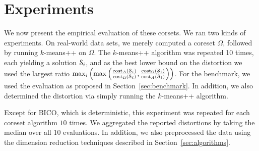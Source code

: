 \section{Experiments} \label{sec:experiments}

We now present the empirical evaluation of these corsets.
We ran two kinds of experiments. On real-world data sets, we merely computed a coreset $\Omega$, followed by running $k$-means++ on $\Omega$. 
The $k$-means++ algorithm was repeated 10 times, each yielding a solution $\mathcal{S}_i$, and as the best lower bound on the distortion we used the largest ratio $\max_i\left(\max\left(\frac{\text{cost}_A(\mathcal{S}_i)}{\text{cost}_{\Omega}(\mathcal{S}_i)},\frac{\text{cost}_{\Omega}(\mathcal{S}_i)}{\text{cost}_A(\mathcal{S}_i)}\right)\right)$.
For the benchmark, we used the evaluation as proposed in Section~\ref{sec:benchmark}. In addition, we also determined the distortion via simply running the $k$-means++ algorithm. 

Except for BICO, which is deterministic, this experiment was repeated for each coreset algorithm $10$ times. We aggregated the reported distortions by taking the median over all $10$ evaluations. In addition, we also preprocessed the data using the dimension reduction techniques described in Section~\ref{sec:algorithms}.



